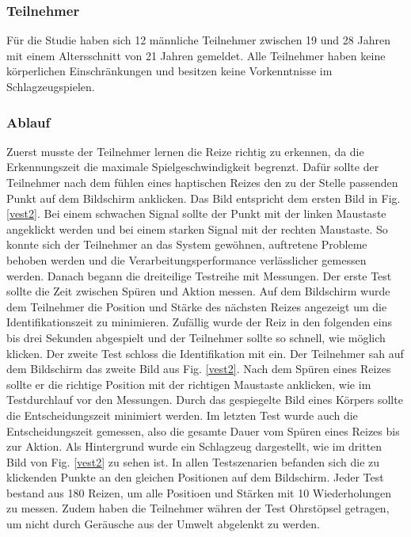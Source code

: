 \documentclass[ngerman,runningheads,a4paper]{llncs}
\begin{document}
\subsubsection{Teilnehmer}
Für die Studie haben sich 12 männliche Teilnehmer zwischen 19 und 28 Jahren mit einem Altersschnitt von 21 Jahren gemeldet. Alle Teilnehmer haben keine körperlichen Einschränkungen und besitzen keine Vorkenntnisse im Schlagzeugspielen.

\subsubsection{Ablauf}
Zuerst musste der Teilnehmer lernen die Reize richtig zu erkennen, da die Erkennungszeit die maximale Spielgeschwindigkeit begrenzt.
Dafür sollte der Teilnehmer nach dem fühlen eines haptischen Reizes den zu der Stelle passenden Punkt auf dem Bildschirm anklicken.
Das Bild entspricht dem ersten Bild in Fig. \ref{vest2}. Bei einem schwachen Signal sollte der Punkt mit der linken Maustaste angeklickt werden und bei einem starken Signal mit der rechten Maustaste. So konnte sich der Teilnehmer an das System gewöhnen, auftretene Probleme behoben werden und die Verarbeitungsperformance verlässlicher gemessen werden.
Danach begann die dreiteilige Testreihe mit Messungen.
Der erste Test sollte die Zeit zwischen Spüren und Aktion messen. Auf dem Bildschirm wurde dem Teilnehmer die Position und Stärke des nächsten Reizes angezeigt um die Identifikationszeit zu minimieren. Zufällig wurde der Reiz in den folgenden eins bis drei Sekunden abgespielt und der Teilnehmer sollte so schnell, wie möglich klicken.
Der zweite Test schloss die Identifikation mit ein. Der Teilnehmer sah auf dem Bildschirm das zweite Bild aus Fig. \ref{vest2}. Nach dem Spüren eines Reizes sollte er die richtige Position mit der richtigen Maustaste anklicken, wie im Testdurchlauf vor den Messungen. Durch das gespiegelte Bild eines Körpers sollte die Entscheidungszeit minimiert werden.
Im letzten Test wurde auch die Entscheidungszeit gemessen, also die gesamte Dauer vom Spüren eines Reizes bis zur Aktion. Als Hintergrund wurde ein Schlagzeug dargestellt, wie im dritten Bild von Fig. \ref{vest2} zu sehen ist.
In allen Testszenarien befanden sich die zu klickenden Punkte an den gleichen Positionen auf dem Bildschirm. Jeder Test bestand aus 180 Reizen, um alle Positioen und Stärken mit 10 Wiederholungen zu messen. Zudem haben die Teilnehmer währen der Test Ohrstöpsel getragen, um nicht durch Geräusche aus der Umwelt abgelenkt zu werden.
\end{document}

